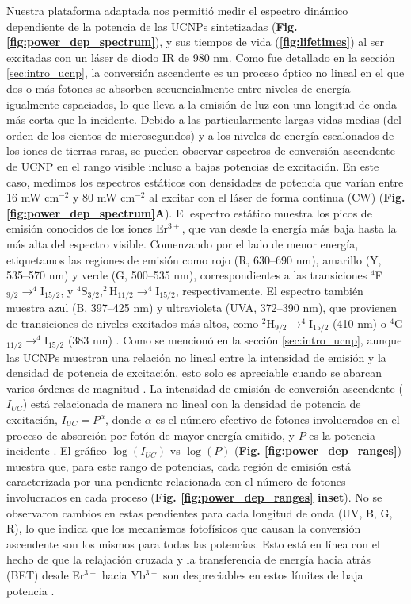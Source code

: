 Nuestra plataforma adaptada nos permitió medir el espectro dinámico dependiente de la potencia de las UCNPs sintetizadas (\textbf{Fig. \ref{fig:power_dep_spectrum}}), y sus tiempos de vida (\textbf{\ref{fig:lifetimes}}) al ser excitadas con un láser de diodo IR de 980 nm.  
Como fue detallado en la sección \ref{sec:intro_ucnp}, la conversión ascendente es un proceso óptico no lineal en el que dos o más fotones se absorben secuencialmente entre niveles de energía igualmente espaciados, lo que lleva a la emisión de luz con una longitud de onda más corta que la incidente.  
Debido a las particularmente largas vidas medias (del orden de los cientos de microsegundos) y a los niveles de energía escalonados de los iones de tierras raras, se pueden observar espectros de conversión ascendente de UCNP en el rango visible incluso a bajas potencias de excitación.  
En este caso, medimos los espectros estáticos con densidades de potencia que varían entre 16 mW cm$^{-2}$ y 80 mW cm$^{-2}$ al excitar con el láser de forma continua (CW) (\textbf{Fig. \ref{fig:power_dep_spectrum}A}).  
El espectro estático muestra los picos de emisión conocidos de los iones Er$^{3+}$, que van desde la energía más baja hasta la más alta del espectro visible.  
Comenzando por el lado de menor energía, etiquetamos las regiones de emisión como rojo (R, 630–690 nm), amarillo (Y, 535–570 nm) y verde (G, 500–535 nm), correspondientes a las transiciones $^4$F$_{9/2} \to ^4$I$_{15/2}$, y $^4$S$_{3/2}, ^2$H$_{11/2} \to ^4$I$_{15/2}$, respectivamente.  
El espectro también muestra azul (B, 397–425 nm) y ultravioleta (UVA, 372–390 nm), que provienen de transiciones de niveles excitados más altos, como $^2$H$_{9/2} \to ^4$I$_{15/2}$ (410 nm) o $^4$G$_{11/2} \to ^4$I$_{15/2}$ (383 nm) \cite{haase_upconverting_2011}.  
Como se mencionó en la sección \ref{sec:intro_ucnp}, aunque las UCNPs muestran una relación no lineal entre la intensidad de emisión y la densidad de potencia de excitación, esto solo es apreciable cuando se abarcan varios órdenes de magnitud \cite{pollnau2000}.  
La intensidad de emisión de conversión ascendente ($I_{UC}$) está relacionada de manera no lineal con la densidad de potencia de excitación, $I_{UC} = P^\alpha$, donde $\alpha$ es el número efectivo de fotones involucrados en el proceso de absorción por fotón de mayor energía emitido, y $P$ es la potencia incidente \cite{Auzel2004}.  
El gráfico $\log{(I_{UC})}$ vs $\log{(P)}$ (\textbf{Fig. \ref{fig:power_dep_ranges}}) muestra que, para este rango de potencias, cada región de emisión está caracterizada por una pendiente relacionada con el número de fotones involucrados en cada proceso (\textbf{Fig. \ref{fig:power_dep_ranges} inset}).  
No se observaron cambios en estas pendientes para cada longitud de onda (UV, B, G, R), lo que indica que los mecanismos fotofísicos que causan la conversión ascendente son los mismos para todas las potencias.  
Esto está en línea con el hecho de que la relajación cruzada y la transferencia de energía hacia atrás (BET) desde Er$^{3+}$ hacia Yb$^{3+}$ son despreciables en estos límites de baja potencia \cite{suyver_anomalous_2005} \cite{berry_disputed_2015}.

